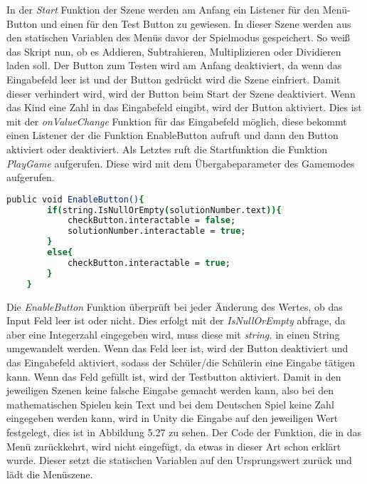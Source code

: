 In der \textit{Start} Funktion der Szene werden am Anfang ein Listener für den Menü-Button und einen für den Test Button zu gewiesen. In dieser Szene werden aus den statischen Variablen des Menüs davor der Spielmodus gespeichert. So weiß das Skript nun, ob es Addieren, Subtrahieren, Multiplizieren oder Dividieren laden soll. Der Button zum Testen wird am Anfang deaktiviert, da wenn das Eingabefeld leer ist und der Button gedrückt wird die Szene einfriert. Damit dieser verhindert wird, wird der Button beim Start der Szene deaktiviert. Wenn das Kind eine Zahl in das Eingabefeld eingibt, wird der Button aktiviert. Dies ist mit der \textit{onValueChange} Funktion für das Eingabefeld möglich, diese bekommt einen Listener der die Funktion EnableButton aufruft und dann den Button aktiviert oder deaktiviert. Als Letztes ruft die Startfunktion die Funktion \textit{PlayGame} aufgerufen. Diese wird mit dem Übergabeparameter des Gamemodes aufgerufen.\\
\begin{lstlisting}[language=csh, caption={MathOperations.cs EnableButton Funktion}]
	public void EnableButton(){
		if(string.IsNullOrEmpty(solutionNumber.text)){
			checkButton.interactable = false;
			solutionNumber.interactable = true;
		}
		else{
			checkButton.interactable = true;
		}
	}
\end{lstlisting}
Die \textit{EnableButton} Funktion überprüft bei jeder Änderung des Wertes, ob das Input Feld leer ist oder nicht. Dies erfolgt mit der \textit{IsNullOrEmpty} abfrage, da aber eine Integerzahl eingegeben wird, muss diese mit \textit{string.} in einen String umgewandelt werden. Wenn das Feld leer ist, wird der Button deaktiviert und das Eingabefeld aktiviert, sodass der Schüler/die Schülerin eine Eingabe tätigen kann. Wenn das Feld gefüllt ist, wird der Testbutton aktiviert. Damit in den jeweiligen Szenen keine falsche Eingabe gemacht werden kann, also bei den mathematischen Spielen kein Text und bei dem Deutschen Spiel keine Zahl eingegeben werden kann, wird in Unity die Eingabe auf den jeweiligen Wert festgelegt, dies ist in Abbildung 5.27 zu sehen.
Der Code der Funktion, die in das Menü zurückkehrt, wird nicht eingefügt, da etwas in dieser Art schon erklärt wurde. Dieser setzt die statischen Variablen auf den Ursprungswert zurück und lädt die Menüszene.\\
